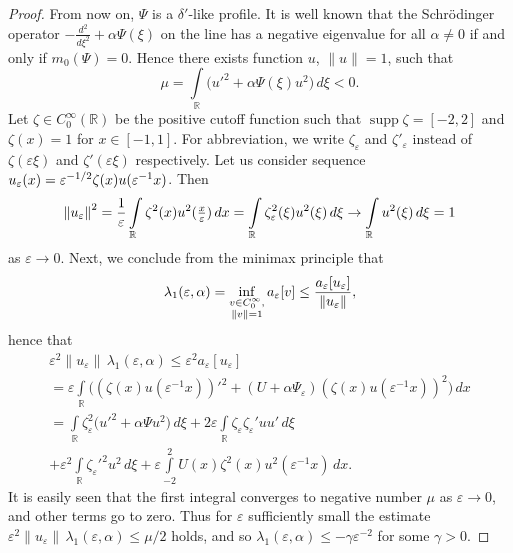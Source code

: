 \documentclass[11pt,english]{amsart}%
\DeclareMathOperator{\supp}{supp} \DeclareMathOperator{\sgn}{sgn}
\begin{document}
\begin{proof}
From now on,  $\Psi$ is a $\delta'$-like profile.
It is well known  \cite[p.~338]{ReedSimonIV} that the Schr\"{o}dinger operator $-\frac{d^2}{d\xi^2}+\alpha\Psi(\xi)$
on the line has  a negative eigenvalue  for all $\alpha\neq 0$ if and only if $m_0(\Psi)=0$.
Hence there exists  function $u$, $\|u\|=1$, such that
\begin{equation*}
    \mu=\int\limits_\mathbb R \bigl(u'^2+\alpha\Psi(\xi)u^2\bigr)\,d\xi<0.
\end{equation*}
Let $\zeta\in C^\infty_0(\mathbb R)$ be the positive  cutoff function such that  $\supp \zeta =[-2,2]$
and $\zeta(x)=1$ for $x\in [-1,1]$.
For abbreviation, we write $\zeta_\varepsilon$ and $\zeta'_\varepsilon$ instead of  $\zeta(\varepsilon\xi)$ and
$\zeta'(\varepsilon\xi)$ respectively. Let us consider  sequence
$u_\varepsilon(x)=\break\varepsilon^{-1/2}\zeta(x)u(\varepsilon^{-1}x)$. Then
 \begin{equation*}
\left\Vert u_\varepsilon\right\Vert^2=\frac{1}{\varepsilon}\int\limits_\mathbb
R\zeta^2(x)u^2({\textstyle\frac{x}{\varepsilon}})\,dx= \int\limits_\mathbb
R\zeta^2_\varepsilon( \xi)u^2(\xi)\,d\xi\rightarrow \int\limits_\mathbb R u^2(\xi)\,d\xi=1
 \end{equation*}
as $\varepsilon\to 0$. Next, we conclude from the minimax principle  that
\begin{equation*}
    \lambda_1(\varepsilon,\alpha)=\inf\limits_{\substack{v\in
C_0^\infty,\\ \left\Vert v\right\Vert=1}}a_{\varepsilon}[v]\leq
\frac{a_{\varepsilon}[u_\varepsilon]}{\|u_\varepsilon\|},
\end{equation*}
hence that
\begin{multline*}
\varepsilon^2\|u_\varepsilon\|\,\lambda_1(\varepsilon,\alpha)\leq
\varepsilon^2a_{\varepsilon}[u_\varepsilon]\\
= \varepsilon
\int\limits_\mathbb R\bigl((\zeta(x)u(\varepsilon^{-1}x))'^2+(U+\alpha \Psi_\varepsilon)(\zeta(x)u(\varepsilon^{-1}x))^2\bigr)\,dx\\
=\int\limits_\mathbb R\zeta^2_\varepsilon\bigl(u'^2+\alpha \Psi u^2\bigr)\,d\xi+
2\varepsilon\int\limits_\mathbb R\zeta_\varepsilon\zeta_\varepsilon' u u'\,d\xi\\+
\varepsilon^2\int\limits_\mathbb R\zeta_\varepsilon'^2u^2\,d\xi+
\varepsilon\int\limits_{-2}^2U(x)\zeta^2(x)u^2(\varepsilon^{-1}x)\,dx.
\end{multline*}
It is easily seen that the first integral converges to negative number  $\mu$ as $\varepsilon\to 0$, and  other terms go to zero. Thus for $\varepsilon$  sufficiently small the estimate
 $\varepsilon^2\|u_\varepsilon\|\,\lambda_1(\varepsilon,\alpha)\leq
\mu/2$ holds, and so  $\lambda_1(\varepsilon,\alpha)\leq -\gamma\varepsilon^{-2}$ for some  $\gamma>0$.


\end{proof}
\end{document}
